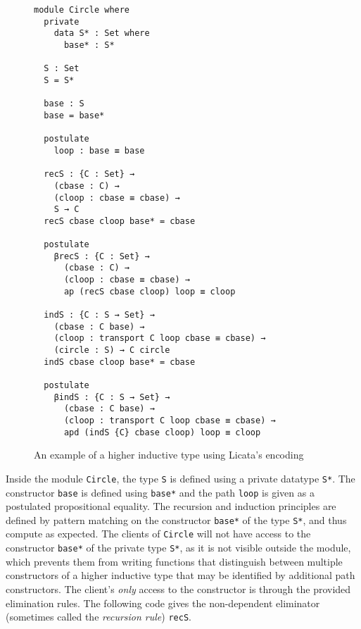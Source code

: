 \documentclass[sigplan,10pt]{acmart}
\begin{document}
\begin{figure}
\begin{center}
\begingroup
\begin{Verbatim}
module Circle where
  private
    data S* : Set where
      base* : S*

  S : Set
  S = S*

  base : S
  base = base*

  postulate
    loop : base ≡ base

  recS : {C : Set} →
    (cbase : C) →
    (cloop : cbase ≡ cbase) →
    S → C
  recS cbase cloop base* = cbase

  postulate
    βrecS : {C : Set} →
      (cbase : C) →
      (cloop : cbase ≡ cbase) →
      ap (recS cbase cloop) loop ≡ cloop

  indS : {C : S → Set} →
    (cbase : C base) →
    (cloop : transport C loop cbase ≡ cbase) →
    (circle : S) → C circle
  indS cbase cloop base* = cbase

  postulate
    βindS : {C : S → Set} →
      (cbase : C base) →
      (cloop : transport C loop cbase ≡ cbase) →
      apd (indS {C} cbase cloop) loop ≡ cloop
\end{Verbatim}
\endgroup
\end{center}

\caption{An example of a higher inductive type using Licata's encoding}
\label{fig:circle-hit}
\end{figure}
\normalsize


Inside the module {\tt Circle}, the type {\tt S} is defined using a private datatype {\tt S*}.
The constructor {\tt base} is defined using {\tt base*} and the path {\tt loop} is given as a postulated propositional equality.
The recursion and induction principles are defined by pattern matching on the constructor {\tt base*} of the type {\tt S*}, and thus compute as expected.
The clients of {\tt Circle} will not have access to the constructor {\tt base*} of the private type {\tt S*}, as it is not visible outside the module, which prevents them from writing functions that distinguish between multiple constructors of a higher inductive type that may be identified by additional path constructors.
The client's \emph{only} access to the constructor is through the provided elimination rules. The following code gives the non-dependent eliminator (sometimes called the \emph{recursion rule}) {\tt recS}.
\end{document}
